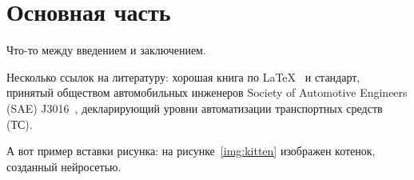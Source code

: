 \chapter{Основная часть}

Что-то между введением и заключением.

Несколько ссылок на литературу: хорошая книга по \LaTeX~\cite{book:Lvov} и
стандарт, принятый обществом автомобильных инженеров Society of Automotive
Engineers (SAE) J3016~\cite{url:SAE_J3016}, декларирующий уровни автоматизации
транспортных средств (ТС). 

А вот пример вставки рисунка: на рисунке~\ref{img:kitten} изображен котенок,
созданный нейросетью.

